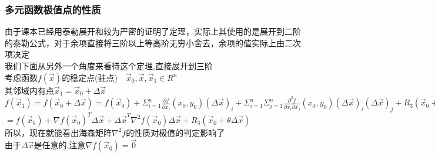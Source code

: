 \documentclass[xetex]{beamer}
\begin{document}
\begin{frame}
\frametitle{多元函数极值点的性质}
	由于课本已经用泰勒展开和较为严密的证明了定理，实际上其使用的是展开到二阶的泰勒公式，对于余项直接将三阶以上等高阶无穷小舍去，余项的值实际上由二次项决定\\
	我们下面从另外一个角度来看待这个定理,直接展开到三阶\\ \pause
	考虑函数$f(\vec x)$的稳定点(驻点)$\quad\vec x_0,\vec x,\vec x_1\in R^n$\\
	其邻域内有点$\vec x_1=\vec x_0+\Delta \vec x$\\ \pause
	$f(\vec x_1)=f(\vec x_0+\Delta \vec x)=f(\vec x_0)+\Sigma_{i=1}^n\frac{\partial f}{\partial x_i}(x_0,y_0)(\Delta \vec x)_i+\Sigma_{i=1}^n\Sigma_{j=1}^n\frac{\partial^2 f}{\partial x_i\partial x_j}(x_0,y_0)(\Delta \vec x)_i(\Delta \vec x)_j+R_3(\vec x_0+\theta\Delta \vec x)$\\
	\quad$=f(\vec x_0)+\nabla f(\vec x_0)^T\Delta \vec x+\Delta \vec x^T\nabla^2 f(\vec x_0)\Delta \vec x+R_3(\vec x_0+\theta\Delta \vec x)$\\ \pause
	所以，现在就能看出海森矩阵$\nabla^2 f$的性质对极值的判定影响了\\
	由于$\Delta \vec x$是任意的,注意$\nabla f(\vec x_0)=\vec 0$\\ \pause

	
	
\end{frame}
\end{document}
